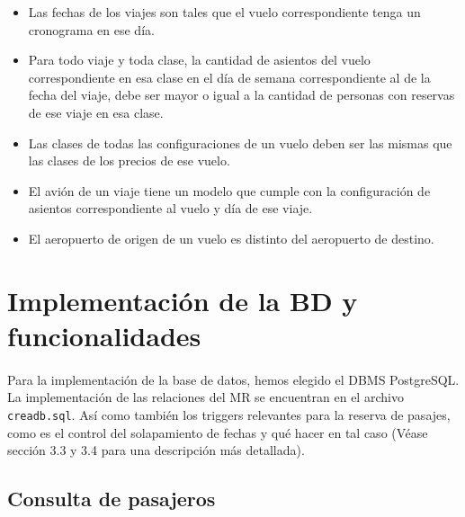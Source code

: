 \documentclass[a4paper,10pt]{article}
\begin{document}
\begin{itemize}

  \item Las fechas de los viajes son tales que el vuelo correspondiente tenga un cronograma en ese día.

  \item Para todo viaje y toda clase, la cantidad de asientos del vuelo correspondiente en esa clase en el día de semana correspondiente al de la fecha del viaje, debe ser mayor o igual a la cantidad de personas con reservas de ese viaje en esa clase.

  \item Las clases de todas las configuraciones de un vuelo deben ser las mismas que las clases de los precios de ese vuelo.

  \item El avión de un viaje tiene un modelo que cumple con la configuración de asientos correspondiente al vuelo y día de ese viaje.

  \item El aeropuerto de origen de un vuelo es distinto del aeropuerto de destino.

\end{itemize}

\newpage
\section{Implementación de la BD y funcionalidades}

\paragraph{}
Para la implementación de la base de datos, hemos elegido el DBMS PostgreSQL.\\

La implementación de las relaciones del MR se encuentran en el archivo \texttt{creadb.sql}. Así como también los triggers relevantes para la reserva de pasajes, como es
el control del solapamiento de fechas y qué hacer en tal caso (Véase sección 3.3 y 3.4 para una descripción más detallada).\\


\subsection{Consulta de pasajeros}
\end{document}
